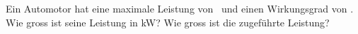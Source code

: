 Ein Automotor hat eine maximale Leistung von \PamO\ und einen Wirkungsgrad von \wgrO. Wie gross ist seine Leistung in kW? Wie gross ist die zugeführte Leistung?
